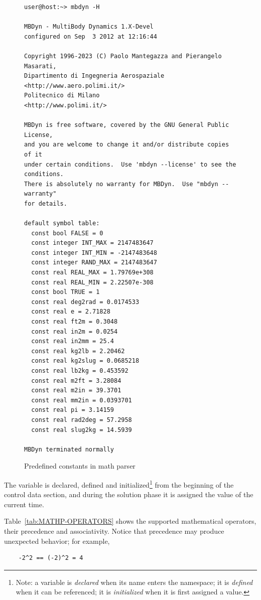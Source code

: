 \begin{figure}
\centering
\small
\begin{minipage}{120mm}
\begin{verbatim}
user@host:~> mbdyn -H

MBDyn - MultiBody Dynamics 1.X-Devel
configured on Sep  3 2012 at 12:16:44

Copyright 1996-2023 (C) Paolo Mantegazza and Pierangelo Masarati,
Dipartimento di Ingegneria Aerospaziale <http://www.aero.polimi.it/>
Politecnico di Milano                   <http://www.polimi.it/>

MBDyn is free software, covered by the GNU General Public License,
and you are welcome to change it and/or distribute copies of it
under certain conditions.  Use 'mbdyn --license' to see the conditions.
There is absolutely no warranty for MBDyn.  Use "mbdyn --warranty"
for details.

default symbol table:
  const bool FALSE = 0
  const integer INT_MAX = 2147483647
  const integer INT_MIN = -2147483648
  const integer RAND_MAX = 2147483647
  const real REAL_MAX = 1.79769e+308
  const real REAL_MIN = 2.22507e-308
  const bool TRUE = 1
  const real deg2rad = 0.0174533
  const real e = 2.71828
  const real ft2m = 0.3048
  const real in2m = 0.0254
  const real in2mm = 25.4
  const real kg2lb = 2.20462
  const real kg2slug = 0.0685218
  const real lb2kg = 0.453592
  const real m2ft = 3.28084
  const real m2in = 39.3701
  const real mm2in = 0.0393701
  const real pi = 3.14159
  const real rad2deg = 57.2958
  const real slug2kg = 14.5939

MBDyn terminated normally
\end{verbatim}
\end{minipage}
\caption{Predefined constants in math parser}
\label{fig:MBDYN-H}
\end{figure}

The variable  is declared, defined and initialized\footnote{
    Note: a variable is \emph{declared} when its name enters the namespace;
    it is \emph{defined} when it can be referenced;
    it is \emph{initialized} when it is first assigned a value.
} from the beginning of the control data section, and during the solution 
phase it is assigned the value of the current time. 

Table~\ref{tab:MATHP-OPERATORS} shows the supported mathematical 
operators, their precedence and associativity.
Notice that precedence may produce unexpected behavior; for example,
\begin{verbatim}
    -2^2 == (-2)^2 = 4
\end{verbatim}

